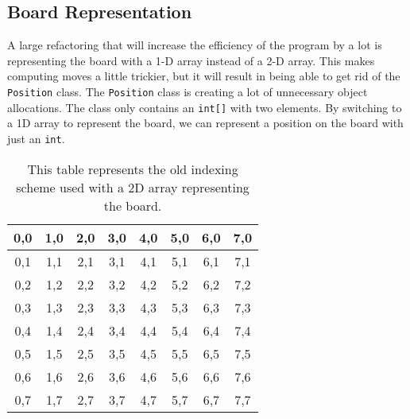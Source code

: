 \documentclass[sigconf]{acmart}
\begin{document}
\subsection{Board Representation} \label{sec:board}
A large refactoring that will increase the efficiency of the program by a lot is representing the board with a 1-D array instead of a 2-D array.
This makes computing moves a little trickier, but it will result in being able to get rid of the \texttt{Position} class.
The \texttt{Position} class is creating a lot of unnecessary object allocations.
The class only contains an \texttt{int[]} with two elements.
By switching to a 1D array to represent the board, we can represent a position on the board with just an \texttt{int}.
\begin{table}[H]
    \renewcommand{\arraystretch}{1.5}
    \setlength{\arrayrulewidth}{1pt}
    \setlength{\tabcolsep}{4pt}
    \begin{tabular}{|c|c|c|c|c|c|c|c|}
        \hline
        0,0  & 1,0  & 2,0  & 3,0  & 4,0  & 5,0  & 6,0  & 7,0  \\
        \hline
        0,1  & 1,1  & 2,1  & 3,1  & 4,1  & 5,1  & 6,1  & 7,1  \\
        \hline
        0,2  & 1,2  & 2,2  & 3,2  & 4,2  & 5,2  & 6,2  & 7,2  \\
        \hline
        0,3  & 1,3  & 2,3  & 3,3  & 4,3  & 5,3  & 6,3  & 7,3  \\
        \hline
        0,4  & 1,4  & 2,4  & 3,4  & 4,4  & 5,4  & 6,4  & 7,4  \\
        \hline
        0,5  & 1,5  & 2,5  & 3,5  & 4,5  & 5,5  & 6,5  & 7,5  \\
        \hline
        0,6  & 1,6  & 2,6  & 3,6  & 4,6  & 5,6  & 6,6  & 7,6  \\
        \hline
        0,7  & 1,7  & 2,7  & 3,7  & 4,7  & 5,7  & 6,7  & 7,7  \\
        \hline
    \end{tabular}
    \caption{This table represents the old indexing scheme used with a 2D array representing the board.}
    \label{tab:example_table}
\end{table}
\end{document}
